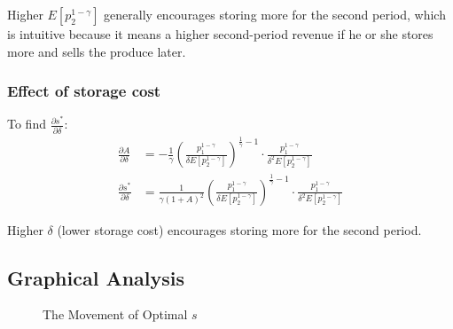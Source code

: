 \documentclass[12pt]{article}
\begin{document}
Higher $E[p_2^{1 - \gamma}]$ generally encourages storing more for the second period, which is intuitive because it means a higher second-period revenue if he or she stores more and sells the produce later.

\subsubsection{Effect of storage cost}

To find $\frac{\partial s^*}{\partial \delta}$:
\begin{align*}
    \frac{\partial A}{\partial \delta} &= -\frac{1}{\gamma} \left( \frac{p_1^{1 - \gamma}}{\delta E[p_2^{1 - \gamma}]} \right)^{\frac{1}{\gamma} - 1} \cdot \frac{p_1^{1 - \gamma}}{\delta^2 E[p_2^{1 - \gamma}]} \\
    \frac{\partial s^*}{\partial \delta} &= \frac{1}{\gamma (1 + A)^2} \left( \frac{p_1^{1 - \gamma}}{\delta E[p_2^{1 - \gamma}]} \right)^{\frac{1}{\gamma} - 1} \cdot \frac{p_1^{1 - \gamma}}{\delta^2 E[p_2^{1 - \gamma}]}
\end{align*}

Higher $\delta$ (lower storage cost) encourages storing more for the second period.


\subsection{Graphical Analysis}

\begin{figure}[h]
    \centering
    \hfill
    \caption{The Movement of Optimal $s$}
    \label{fig:model demonstration}
\end{figure}
\end{document}
